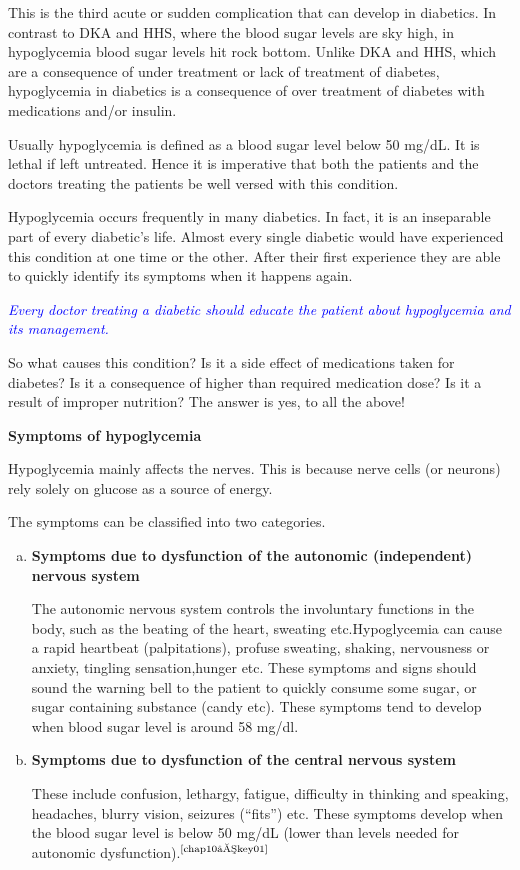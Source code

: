 \vskip 4pt
\vskip 4pt

This is the third acute or sudden complication that can develop in diabetics. In contrast to DKA and HHS, where the blood sugar levels are sky high, in hypoglycemia blood sugar levels hit rock bottom. Unlike DKA and HHS, which are a consequence of under treatment or lack of treatment of diabetes, hypoglycemia in diabetics is a consequence of over treatment of diabetes with medications and/or insulin.

Usually hypoglycemia is defined as a blood sugar level below 50 mg/dL. It is lethal if left untreated. Hence it is imperative that both the patients and the doctors treating the patients be well versed with this condition.

Hypoglycemia occurs frequently in many diabetics. In fact, it is an inseparable part of every diabetic’s life. Almost every single diabetic would have experienced this condition at one time or the other. After their first experience they are able to quickly identify its symptoms when it happens again.

\textcolor{blue}{\textit{Every doctor treating a diabetic should educate the patient about hypoglycemia and its management.}}

So what causes this condition? Is it a side effect of medications taken for diabetes? Is it a consequence of higher than required medication dose? Is it a result of improper nutrition? The answer is yes, to all the above!

\noindent\textbf{Symptoms of hypoglycemia}

Hypoglycemia mainly affects the nerves. This is because nerve cells (or neurons) rely solely on glucose as a source of energy.

\noindent The symptoms can be classified into two categories.

\vspace{-\topsep}
\begin{enumerate}[a)]
\itemsep=0pt
\item \textbf{Symptoms due to dysfunction of the autonomic (independent) nervous system}

The autonomic nervous system controls the involuntary functions in the body, such as the beating of the heart, sweating etc.\break Hypoglycemia can cause a rapid heartbeat (palpitations), profuse sweating, shaking, nervousness or anxiety, tingling sensation,\break hunger etc. These symptoms and signs should sound the warning bell to the patient to quickly consume some sugar, or sugar contai\-ning substance (candy etc). These symptoms tend to develop when blood sugar level is around 58 mg/dl.
 \item \textbf{Symptoms due to dysfunction of the central nervous system}

These include confusion, lethargy, fatigue, difficulty in thinking and speaking, headaches, blurry vision, seizures (“fits”) etc. These symptoms develop when the blood sugar level is below 50 mg/dL (lower than levels needed for autonomic dysfunction).$^{\text{\cite{chap10–key01}}}$
\end{enumerate}
\vspace{-\topsep}

